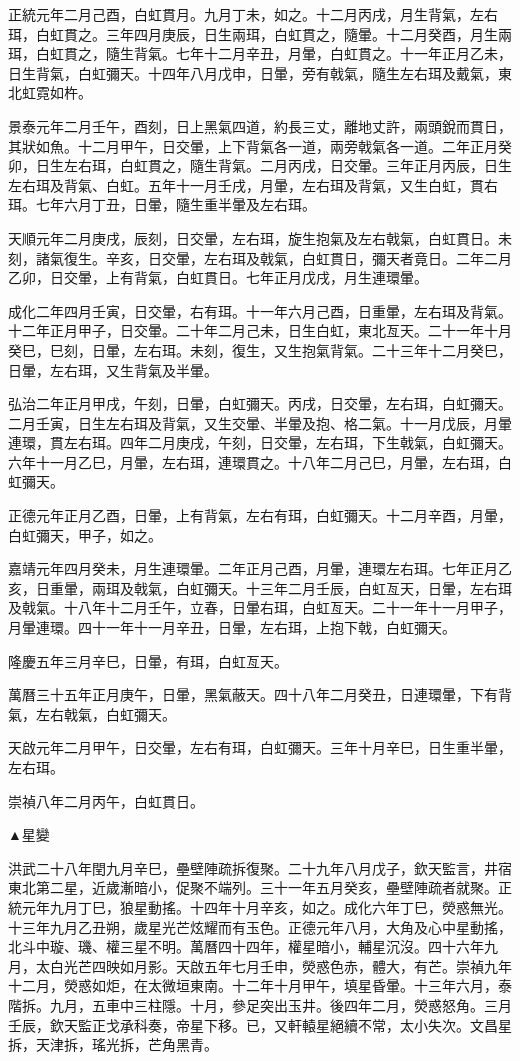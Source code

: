 \begin{pinyinscope}
正統元年二月己酉，白虹貫月。九月丁未，如之。十二月丙戌，月生背氣，左右珥，白虹貫之。三年四月庚辰，日生兩珥，白虹貫之，隨暈。十二月癸酉，月生兩珥，白虹貫之，隨生背氣。七年十二月辛丑，月暈，白虹貫之。十一年正月乙未，日生背氣，白虹彌天。十四年八月戊申，日暈，旁有戟氣，隨生左右珥及戴氣，東北虹霓如杵。

景泰元年二月壬午，酉刻，日上黑氣四道，約長三丈，離地丈許，兩頭銳而貫日，其狀如魚。十二月甲午，日交暈，上下背氣各一道，兩旁戟氣各一道。二年正月癸卯，日生左右珥，白虹貫之，隨生背氣。二月丙戌，日交暈。三年正月丙辰，日生左右珥及背氣、白虹。五年十一月壬戌，月暈，左右珥及背氣，又生白虹，貫右珥。七年六月丁丑，日暈，隨生重半暈及左右珥。

天順元年二月庚戌，辰刻，日交暈，左右珥，旋生抱氣及左右戟氣，白虹貫日。未刻，諸氣復生。辛亥，日交暈，左右珥及戟氣，白虹貫日，彌天者竟日。二年二月乙卯，日交暈，上有背氣，白虹貫日。七年正月戊戌，月生連環暈。

成化二年四月壬寅，日交暈，右有珥。十一年六月己酉，日重暈，左右珥及背氣。十二年正月甲子，日交暈。二十年二月己未，日生白虹，東北亙天。二十一年十月癸巳，巳刻，日暈，左右珥。未刻，復生，又生抱氣背氣。二十三年十二月癸巳，日暈，左右珥，又生背氣及半暈。

弘治二年正月甲戌，午刻，日暈，白虹彌天。丙戌，日交暈，左右珥，白虹彌天。二月壬寅，日生左右珥及背氣，又生交暈、半暈及抱、格二氣。十一月戊辰，月暈連環，貫左右珥。四年二月庚戌，午刻，日交暈，左右珥，下生戟氣，白虹彌天。六年十一月乙巳，月暈，左右珥，連環貫之。十八年二月己巳，月暈，左右珥，白虹彌天。

正德元年正月乙酉，日暈，上有背氣，左右有珥，白虹彌天。十二月辛酉，月暈，白虹彌天，甲子，如之。

嘉靖元年四月癸未，月生連環暈。二年正月己酉，月暈，連環左右珥。七年正月乙亥，日重暈，兩珥及戟氣，白虹彌天。十三年二月壬辰，白虹亙天，日暈，左右珥及戟氣。十八年十二月壬午，立春，日暈右珥，白虹亙天。二十一年十一月甲子，月暈連環。四十一年十一月辛丑，日暈，左右珥，上抱下戟，白虹彌天。

隆慶五年三月辛巳，日暈，有珥，白虹亙天。

萬曆三十五年正月庚午，日暈，黑氣蔽天。四十八年二月癸丑，日連環暈，下有背氣，左右戟氣，白虹彌天。

天啟元年二月甲午，日交暈，左右有珥，白虹彌天。三年十月辛巳，日生重半暈，左右珥。

崇禎八年二月丙午，白虹貫日。

▲星變

洪武二十八年閏九月辛巳，壘壁陣疏拆復聚。二十九年八月戊子，欽天監言，井宿東北第二星，近歲漸暗小，促聚不端列。三十一年五月癸亥，壘壁陣疏者就聚。正統元年九月丁巳，狼星動搖。十四年十月辛亥，如之。成化六年丁巳，熒惑無光。十三年九月乙丑朔，歲星光芒炫耀而有玉色。正德元年八月，大角及心中星動搖，北斗中璇、璣、權三星不明。萬曆四十四年，權星暗小，輔星沉沒。四十六年九月，太白光芒四映如月影。天啟五年七月壬申，熒惑色赤，體大，有芒。崇禎九年十二月，熒惑如炬，在太微垣東南。十二年十月甲午，填星昏暈。十三年六月，泰階拆。九月，五車中三柱隱。十月，參足突出玉井。後四年二月，熒惑怒角。三月壬辰，欽天監正戈承科奏，帝星下移。已，又軒轅星絕續不常，太小失次。文昌星拆，天津拆，瑤光拆，芒角黑青。


\end{pinyinscope}
